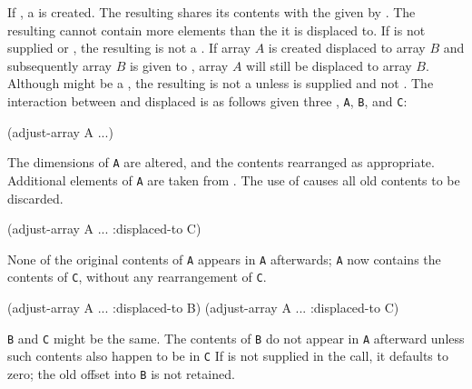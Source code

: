 If 
, a 
is created. The resulting  shares its contents with the  given by
.
The resulting  cannot contain more elements than the 
it is displaced to.  
If  is not supplied or \nil,
the resulting  is not a .
If array $A$ is created displaced to array $B$ and subsequently
array $B$ is given to , array $A$ will still be
displaced to array $B$.
Although  might be a , 
the resulting  is not a  unless
 is supplied and not \nil.
The interaction between  and 
displaced  
is as follows given three , {\tt A}, {\tt B}, and {\tt C}:

\beginlist
{}

\code
 (adjust-array A ...)
\endcode

The dimensions of {\tt A} are altered, and the
contents rearranged as appropriate.  
Additional elements of {\tt A} are taken from
.  
The use of  causes all old contents to be
discarded.


\code
 (adjust-array A ... :displaced-to C)
\endcode
               
None of the original contents of {\tt A} appears in 
{\tt A} afterwards; {\tt A} now contains
the contents of {\tt C}, without any rearrangement of {\tt C}.


\code
 (adjust-array A ... :displaced-to B)
 (adjust-array A ... :displaced-to C)
\endcode

{\tt B} and {\tt C} might be the same. The contents of {\tt B} do not appear in 
{\tt A} afterward unless such contents also happen to be in {\tt C}  If
is not supplied in the  call, it defaults
to zero; the old offset into {\tt B} is not retained.
                                  

